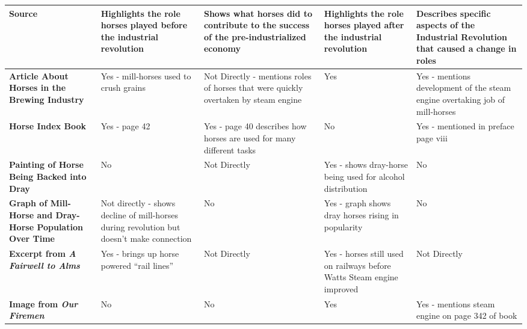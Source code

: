 \RaggedRight
{\renewcommand{\arraystretch}{2}
\begin{longtable}{ | p{3cm} | p{3cm} | p{3cm} | p{3cm} | p{3cm} | }
\hline
\textbf{Source} &  
\textbf{Highlights the role horses played before the industrial revolution} &
\textbf{Shows what horses did to contribute to the success of the pre-industrialized economy} &
\textbf{Highlights the role horses played after the industrial revolution} &   
\textbf{Describes specific aspects of the Industrial Revolution that caused a change in roles}
\\\hline

\textbf{Article About Horses in the Brewing Industry} &
Yes - mill-horses used to crush grains & Not Directly - mentions roles of horses that were quickly overtaken by steam engine& Yes & Yes - mentions development of the steam engine overtaking job of mill-horses\\\hline

\textbf{Horse Index Book} &
Yes - page 42 & Yes - page 40 describes how horses are used for many different tasks & 
No & Yes - mentioned in preface page viii \\\hline

\textbf{Painting of Horse Being Backed into Dray} &
No & Not Directly & Yes - shows dray-horse being used for alcohol distribution & No \\\hline

\textbf{Graph of Mill-Horse and Dray-Horse Population Over Time} &
Not directly - shows decline of mill-horses during revolution but doesn't make connection & 
No & Yes - graph shows dray horses rising in popularity & No \\\hline

\textbf{Excerpt from \emph{A Fairwell to Alms}} &
Yes - brings up horse powered ``rail lines'' &
Not Directly &
Yes - horses still used on railways before Watts Steam engine improved & Not Directly   \\\hline

\textbf{Image from \emph{Our Firemen}} &
No & No & Yes &
Yes - mentions steam engine on page 342 of book
\\\hline
\end{longtable}}